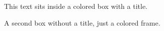 \documentclass{article}
\begin{document}
\begin{tcolorbox}[title=Important,colback=blue!5,colframe=blue!60!black]
This text sits inside a colored box with a title.
\end{tcolorbox}
\begin{tcolorbox}[colback=red!5,colframe=red!60!black]
A second box without a title, just a colored frame.
\end{tcolorbox}
\end{document}

